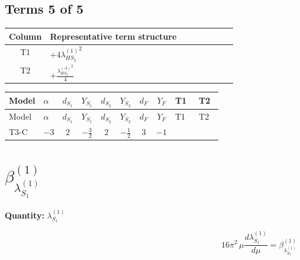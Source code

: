 \documentclass[8pt]{article}
\begin{document}
\begin{landscape}
\subsection*{Terms 5 of 5}
\begin{center}
\begin{tabular}{@{}c >{\raggedright\arraybackslash}p{0.82\linewidth}@{}}
\toprule
Column & Representative term structure \\
\midrule
T1 & \(\displaystyle +4 {\lambda_{HS_2}^{(1)}}^2\) \\
\midrule
T2 & \(\displaystyle +\frac{{\lambda_{HS_2}^{(A)}}^2}{4}\) \\
\midrule
\bottomrule
\end{tabular}
\end{center}
\smallskip
\tiny
\begin{longtable}{@{}llcccccc >{\raggedright\arraybackslash}p{0.21\linewidth} >{\raggedright\arraybackslash}p{0.21\linewidth}@{}}
\toprule
Model & $\alpha$ & $d_{S_1}$ & $Y_{S_1}$ & $d_{S_2}$ & $Y_{S_2}$ & $d_F$ & $Y_F$ & T1 & T2 \\
\midrule
\endfirsthead
\toprule
Model & $\alpha$ & $d_{S_1}$ & $Y_{S_1}$ & $d_{S_2}$ & $Y_{S_2}$ & $d_F$ & $Y_F$ & T1 & T2 \\
\midrule
\endhead
T3-C & $-3$ & $2$ & $-\frac{3}{2}$ & $2$ & $-\frac{1}{2}$ & $3$ & $-1$ & \scriptsize\adjustbox{max width=\linewidth}{$\begin{gathered} +4 {\lambda_{HS_2}^{(1)}}^2\end{gathered}$} & \scriptsize\adjustbox{max width=\linewidth}{$\begin{gathered} +\frac{{\lambda_{HS_2}^{(A)}}^2}{4}\end{gathered}$} \\
\midrule
\bottomrule
\end{longtable}
\clearpage
\section*{$\beta_{\lambda_{S_1}^{(1)}}^{(1)}$}
\noindent\textbf{Quantity: }$\lambda_{S_1}^{(1)}$\par\smallskip
\[16\pi^2\,\mu\frac{d \lambda_{S_1}^{(1)}}{d\mu}=\beta_{\lambda_{S_1}^{(1)}}^{(1)}\]

\end{landscape}
\end{document}
